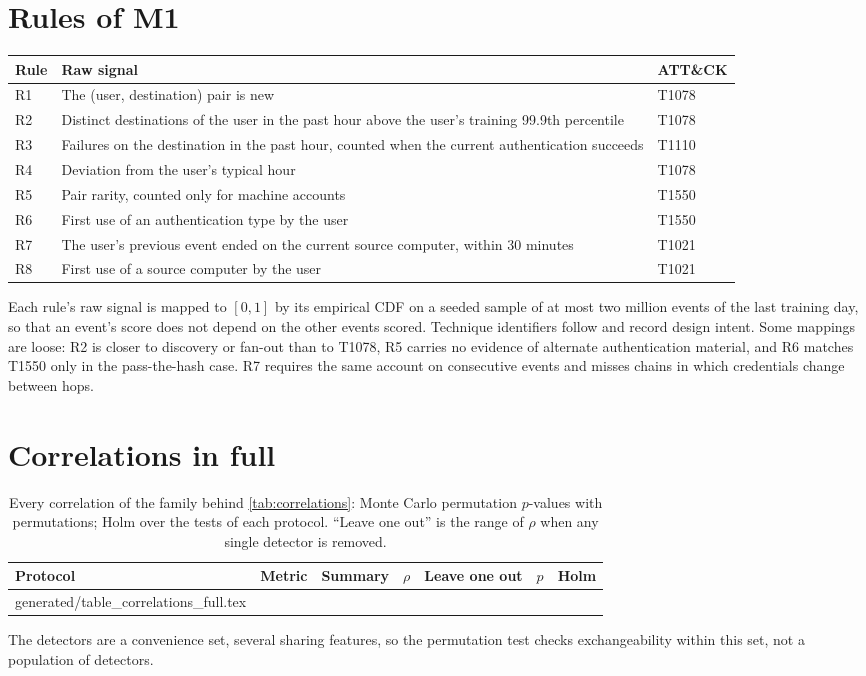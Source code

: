 \documentclass[11pt,a4paper]{article}
\makeatletter
\newcommand{\tablerows}[1]{\@@input #1 }
\makeatother
\begin{document}
\section{Rules of M1}
\label{app:rules}
\begin{table}[H]
\centering
\footnotesize
\begin{tabular}{@{}lp{9.0cm}l@{}}
\toprule
Rule & Raw signal & ATT\&CK \\
\midrule
R1 & The (user, destination) pair is new & T1078 \\
R2 & Distinct destinations of the user in the past hour above the user's training 99.9th percentile & T1078 \\
R3 & Failures on the destination in the past hour, counted when the current authentication succeeds & T1110 \\
R4 & Deviation from the user's typical hour & T1078 \\
R5 & Pair rarity, counted only for machine accounts & T1550 \\
R6 & First use of an authentication type by the user & T1550 \\
R7 & The user's previous event ended on the current source computer, within 30 minutes & T1021 \\
R8 & First use of a source computer by the user & T1021 \\
\bottomrule
\end{tabular}
\end{table}
Each rule's raw signal is mapped to $[0, 1]$ by its empirical CDF on a seeded sample of at most two million events of the last training day, so that an event's score does not depend on the other events scored. Technique identifiers follow \textcite{strom2018attack} and record design intent. Some mappings are loose: R2 is closer to discovery or fan-out than to T1078, R5 carries no evidence of alternate authentication material, and R6 matches T1550 only in the pass-the-hash case. R7 requires the same account on consecutive events and misses chains in which credentials change between hops.

\section{Correlations in full}
\label{app:correlations}
\begin{table}[H]
\centering
\footnotesize
\setlength{\tabcolsep}{4pt}
\caption{Every correlation of the family behind \cref{tab:correlations}: Monte Carlo permutation $p$-values with \PermutationCount{} permutations; Holm over the \CorrelationFamily{} tests of each protocol. \enquote{Leave one out} is the range of $\rho$ when any single detector is removed.}
\label{tab:correlations-full}
\begin{tabular}{@{}lllrlrr@{}}
\toprule
Protocol & Metric & Summary & $\rho$ & Leave one out & $p$ & Holm \\
\midrule
\tablerows{generated/table_correlations_full.tex}
\bottomrule
\end{tabular}
\end{table}
The detectors are a convenience set, several sharing features, so the permutation test checks exchangeability within this set, not a population of detectors.
\end{document}

